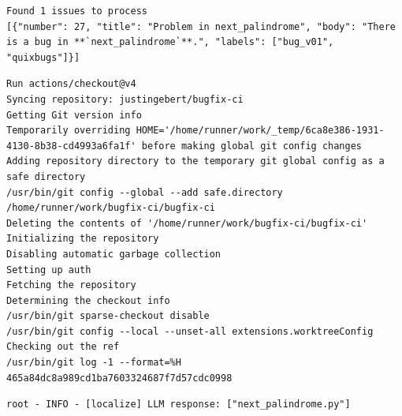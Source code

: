 \begin{lstlisting}[style=log, caption={Filtered issues log excerpt}, label={lst:filtered-issues}, basicstyle=\ttfamily\small, breaklines=true, frame=single, columns=fullflexible]
Found 1 issues to process
[{"number": 27, "title": "Problem in next_palindrome", "body": "There is a bug in **`next_palindrome`**.", "labels": ["bug_v01", "quixbugs"]}]
\end{lstlisting}

\begin{lstlisting}[style=log, caption={Code checkout log excerpt}, label={fig:code-checkout}, basicstyle=\ttfamily\small, breaklines=true, frame=single, columns=fullflexible]
Run actions/checkout@v4
Syncing repository: justingebert/bugfix-ci
Getting Git version info
Temporarily overriding HOME='/home/runner/work/_temp/6ca8e386-1931-4130-8b38-cd4993a6fa1f' before making global git config changes
Adding repository directory to the temporary git global config as a safe directory
/usr/bin/git config --global --add safe.directory /home/runner/work/bugfix-ci/bugfix-ci
Deleting the contents of '/home/runner/work/bugfix-ci/bugfix-ci'
Initializing the repository
Disabling automatic garbage collection
Setting up auth
Fetching the repository
Determining the checkout info
/usr/bin/git sparse-checkout disable
/usr/bin/git config --local --unset-all extensions.worktreeConfig
Checking out the ref
/usr/bin/git log -1 --format=%H
465a84dc8a989cd1ba7603324687f7d57cdc0998
\end{lstlisting}

\begin{lstlisting}[style=log, caption={Bug localization log excerpt}, label={lst:loc}]
root - INFO - [localize] LLM response: ["next_palindrome.py"]
\end{lstlisting}

